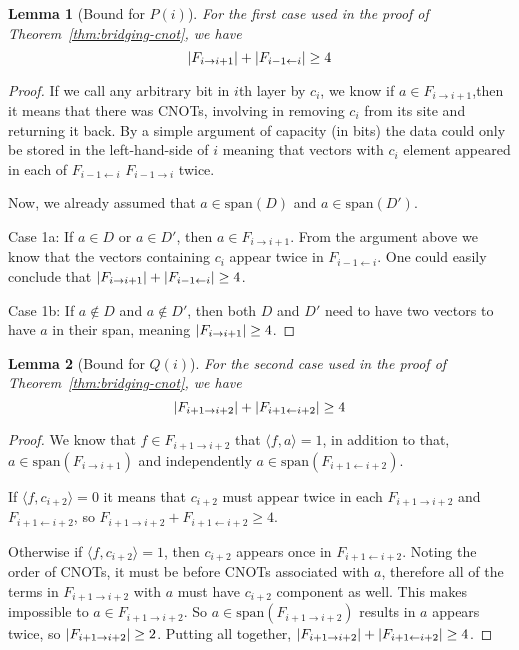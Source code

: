 \documentclass{report}
\newtheorem{lemma}{Lemma}
\begin{document}
\begin{lemma}[Bound for $P(i)$]
  For the first case used in the proof of Theorem~\ref{thm:bridging-cnot}, we have 
  \begin{equation}
    \abs{F_{i \rightarrow i+1}} + \abs{F_{i-1 \leftarrow i}} \geq 4
  \end{equation}
\end{lemma}
\begin{proof}
  If we call any arbitrary bit in $i$th layer by $c_i$, we know if $a \in F_{i \rightarrow i + 1}$,then it means that there was CNOTs, involving in removing $c_i$ from its site and returning it back. By a simple argument of capacity (in bits) the data could only be stored in the left-hand-side of $i$ meaning that vectors with $c_i$ element appeared in each of $F_{i-1 \leftarrow i}$ $F_{i-1 \rightarrow i}$ twice.

  Now, we already assumed that $a \in \mathrm{span}(D)$ and $a \in \mathrm{span}(D')$. 

  Case 1a: If $a \in D$ or $a \in D'$, then $a \in F_{i \rightarrow {i+1}}$. From the argument above we know that the vectors containing $c_i$ appear twice in $F_{i-1 \leftarrow i}$. One could easily conclude that $\abs{F_{i \rightarrow i+1}} + \abs{F_{i-1 \leftarrow i}} \geq 4$. 

  Case 1b: If $a \notin D$ and $a \notin D'$, then both $D$ and $D'$ need to have two vectors to have $a$ in their span, meaning $\abs{F_{i \rightarrow i+1}} \geq 4$.
\end{proof}

\begin{lemma}[Bound for $Q(i)$]
  For the second case used in the proof of Theorem~\ref{thm:bridging-cnot}, we have 
  \begin{equation}
    \abs{F_{i+1 \rightarrow i+2}} + \abs{F_{i+1 \leftarrow i+2}} \geq 4
  \end{equation}
\end{lemma}
\begin{proof}
  We know that $f \in F_{i+1 \rightarrow i+2}$ that $\langle f, a \rangle = 1$, in addition to that, $
  a \in \mathrm{span}(F_{i \rightarrow i+1})$ and independently $a \in \mathrm{span}(F_{i+1 \leftarrow i+2})$.

  If $\langle f, c_{i+2} \rangle = 0$ it means that $c_{i+2}$ must appear twice in each $F_{i+1 \rightarrow i+2}$ and $F_{i+1 \leftarrow i+2}$, so $F_{i+1 \rightarrow i+2} + F_{i+1 \leftarrow i+2} \geq 4$.

  Otherwise if $\langle f, c_{i+2} \rangle = 1$, then $c_{i+2}$ appears once in $F_{i+1 \leftarrow i+2}$. Noting the order of CNOTs, it must be before CNOTs associated with $a$, therefore all of the terms in $F_{i+1 \rightarrow i+2}$ with $a$ must have $c_{i+2}$ component as well. This makes impossible to $a \in F_{i+1 \rightarrow i+2}$. So $a \in \mathrm{span}(F_{i+1 \rightarrow i+2})$ results in $a$ appears twice, so $\abs{F_{i+1 \rightarrow i+2}} \geq 2$. Putting all together, $\abs{F_{i+1 \rightarrow i+2}} + \abs{F_{i+1 \leftarrow i+2}} \geq 4$.
\end{proof}
\end{document}
